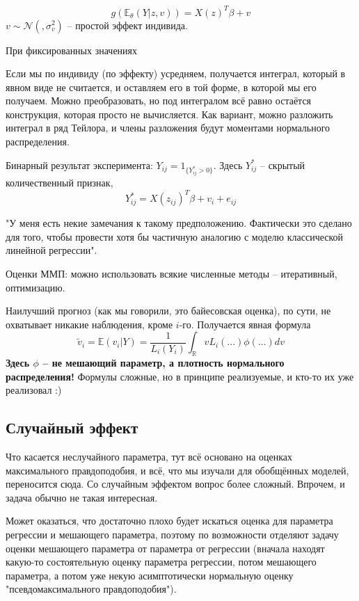 \documentclass[main.tex]{subfiles}
\begin{document}
\[ g(\mathds E_\theta (Y|z,v)) = X(z)^T\beta + v \]
$v \sim \mathcal N(, \sigma_v^2)$ -- простой эффект индивида.

При фиксированных значениях %

Если мы по индивиду (по эффекту) усредняем, получается интеграл, который в явном виде не считается, и оставляем его в той форме, в которой мы его получаем.
Можно преобразовать, но под интегралом всё равно остаётся конструкция, которая просто не вычисляется.
Как вариант, можно разложить интеграл в ряд Тейлора, и члены разложения будут моментами нормального распределения.


Бинарный результат эксперимента: $ Y_{ij} = 1_{\{Y_{ij}^* > 0\}} $.
Здесь $ Y_{ij}^* $ -- скрытый количественный признак,
\[ Y_{ij}^* = X(z_{ij})^T \beta + v_i + e_{ij} \]

\begin{leftbar}
	"У меня есть некие замечания к такому предположению. Фактически это сделано для того, чтобы провести хотя бы частичную аналогию с моделю классической линейной регрессии".
\end{leftbar}

Оценки ММП: можно использовать всякие численные методы -- итеративный, оптимизацию.

Наилучший прогноз (как мы говорили, это байесовская оценка), по сути, не охватывает никакие наблюдения, кроме $ i $-го.
Получается явная формула
\[ \tilde v_i = \mathds E (v_i | Y) = \frac{1}{L_i(Y_i)} \int_{\mathds R} v L_i(...) \phi(...) dv \]
\textbf{Здесь $ \phi $  --  не мешающий параметр, а плотность нормального распределения!}
Формулы сложные, но в принципе реализуемые, и кто-то их уже реализовал :)


\subsection{Случайный эффект}

Что касается неслучайного параметра, тут всё основано на оценках максимального правдоподобия, и всё, что мы изучали для обобщённых моделей, переносится сюда.
Со случайным эффектом вопрос более сложный.
Впрочем, и задача обычно не такая интересная.

Может оказаться, что достаточно плохо будет искаться оценка для параметра регрессии и мешающего параметра, поэтому по возможности отделяют задачу оценки мешающего параметра от параметра от регрессии (вначала находят какую-то состоятельную оценку параметра регрессии, потом мешающего параметра, а потом уже некую асимптотически нормальную оценку "псевдомаксимального правдоподобия").
\end{document}
